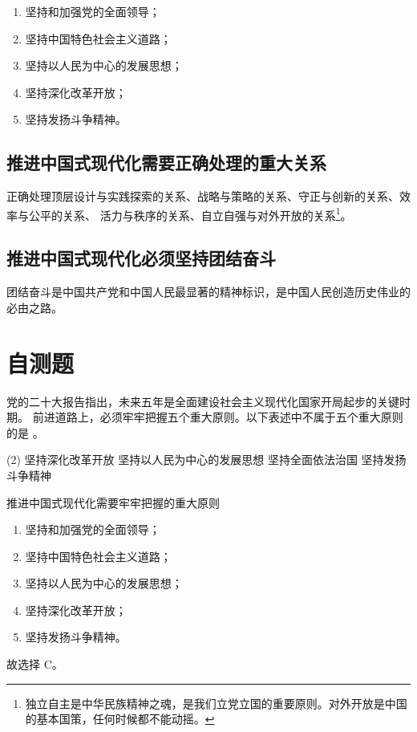 \documentclass[UTF8,10pt]{ctexbook} %
\begin{document}
\begin{enumerate}[itemsep=0pt, label=(\arabic*)]
    \item 坚持和加强党的全面领导；
    \item 坚持中国特色社会主义道路；
    \item 坚持以人民为中心的发展思想；
    \item 坚持深化改革开放；
    \item 坚持发扬斗争精神。
\end{enumerate}

\subsection{推进中国式现代化需要正确处理的重大关系}

正确处理顶层设计与实践探索的关系、战略与策略的关系、守正与创新的关系、效率与公平的关系、
活力与秩序的关系、自立自强与对外开放的关系\footnote{独立自主是中华民族精神之魂，是我们立党立国的重要原则。对外开放是中国的基本国策，任何时候都不能动摇。}。

\subsection{推进中国式现代化必须坚持团结奋斗}

团结奋斗是中国共产党和中国人民最显著的精神标识，是中国人民创造历史伟业的必由之路。

\section{自测题}
\setcounter{example}{0}

\begin{example}
    党的二十大报告指出，未来五年是全面建设社会主义现代化国家开局起步的关键时期。
    前进道路上，必须牢牢把握五个重大原则。以下表述中不属于五个重大原则的是 \underline{\qquad \qquad \qquad}。
    \begin{tasks}[label={\Alph*. }](2)
        \task 坚持深化改革开放
        \task 坚持以人民为中心的发展思想
        \task 坚持全面依法治国
        \task 坚持发扬斗争精神
    \end{tasks}
    \begin{sol}
    推进中国式现代化需要牢牢把握的重大原则
    \begin{enumerate}[itemsep=0pt, label=(\arabic*)]
        \item 坚持和加强党的全面领导；
        \item 坚持中国特色社会主义道路；
        \item 坚持以人民为中心的发展思想；
        \item 坚持深化改革开放；
        \item 坚持发扬斗争精神。
    \end{enumerate}
    故选择 C。
    \end{sol}
\end{example}
\end{document}
